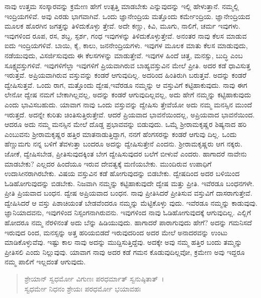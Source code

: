 ನಾವು ಉತ್ತಮ ಸಂಸ್ಕಾರವನ್ನು ಕ್ರಮೇಣ ಹೇಗೆ ಉತ್ಪತ್ತಿ ಮಾಡಬೇಕು ಎನ್ನುವುದನ್ನು ಇಲ್ಲಿ ಹೇಳುತ್ತಾನೆ. ನಮ್ಮಲ್ಲಿ ಇಂದ್ರಿಯಗಳಿವೆ. ಅವು ಎರಡು ಭಾಗವಾಗಿವೆ. ಒಂದು ಜ್ಞಾನೇಂದ್ರಿಯ ಮತ್ತೊಂದು ಕರ್ಮೇಂದ್ರಿಯ. ಜ್ಞಾನೇಂದ್ರಿಯದ ಮೂಲಕ ಹೊರಗಿನ ಜಗತ್ತನ್ನು ತಿಳಿದುಕೊಳ್ಳು ತ್ತೇವೆ. ಅದೇ ಕಣ್ಣು, ಕಿವಿ, ಮೂಗು, ನಾಲಿಗೆ, ಚರ್ಮ ಇವುಗಳು. ಇವುಗಳಿಂದ ರೂಪ, ರಸ, ಶಬ್ದ, ಸ್ಪರ್ಶ, ಗಂಧ ಇವುಗಳನ್ನು ತಿಳಿದುಕೊಳ್ಳುತ್ತೇವೆ. ಅನಂತರ ನಾವು ಕೆಲಸ ಮಾಡುವ ಐದು ಇಂದ್ರಿಯಗಳಿವೆ. ಬಾಯಿ, ಕೈ, ಕಾಲು, ಜನನೇಂದ್ರಿಯಗಳು. ಇವುಗಳ ಮೂಲಕ ಮಾತು ಕೆಲಸ ಮಾಡುವುದು, ನಡೆಯುವುದು, ವಿಸರ್ಜಿಸುವುದು ಈ ಕೆಲಸಗಳನ್ನು ಮಾಡುತ್ತೇವೆ. ಇವುಗಳ ಹಿಂದೆ ಚಿತ್ತ, ಮನಸ್ಸು, ಬುದ್ಧಿ ಎಂಬ ಸೂಕ್ಷ್ಮವಸ್ತುಗಳಿವೆ. ಇವುಗಳಿಗೆಲ್ಲಾ ಇವುಗಳಿಗೆ ಪ್ರಿಯವಾಗಿರುವ ಬಾಹ್ಯವಸ್ತುವಿನ ಮೇಲೆ ಪ್ರೀತಿ. ಅದರ ಕಡೆ ಧಾವಿಸುತ್ತ ಇರುತ್ತವೆ. ಅಪ್ರಿಯವಾಗಿರುವ ವಸ್ತುವನ್ನು ಕಂಡರೆ ಆಗುವುದಿಲ್ಲ. ಅದರಿಂದ ಹಿಂತಿರುಗಿ ಬರುತ್ತವೆ. ಅದನ್ನು ಕಂಡರೆ ದ್ವೇಷಿಸುತ್ತವೆ. ಒಂದು ರಾಗ, ಮತ್ತೊಂದು ದ್ವೇಷ,ಇವೆರಡೂ ನಮ್ಮನ್ನು ಆ ವಸ್ತುವಿಗೆ ಕಟ್ಟಿಹಾಕುವುದು. ನಾವು ಈಗ ಲೇನೋ ದ್ವೇಷ ನಮಗೆ ಬೇಕಾಗಿಲ್ಲವಲ್ಲ, ಅದನ್ನು ಕಂಡರೆ ಆಗುವುದಿಲ್ಲವಲ್ಲ, ಅದು ಹೇಗೆ ನಮ್ಮನ್ನು ಕಟ್ಟಿಹಾಕುವುದು ಎಂದು ಭಾವಿಸಬಹುದು. ಯಾವಾಗ ನಾವು ಒಂದು ವಸ್ತುವನ್ನು ದ್ವೇಷಿಸು ತ್ತೇವೆಯೋ ಅದು ನಮ್ಮ ಮನಸ್ಸಿನ ಮುಂದೆ ಇರುತ್ತದೆ. ಅದನ್ನೇ ಕುರಿತು ಚಿಂತಿಸುತ್ತಿರುತ್ತೇವೆ. ಆದರೆ ಪ್ರಿಯವಾದ ಭಾವನೆಯಿಂದಲ್ಲ, ಅಪ್ರಿಯವಾದ ಭಾವನೆಯಿಂದ. ಆದರೂ ಅದು ನಮ್ಮ ಮನಸ್ಸಿನ ಮೇಲೆ ದೊಡ್ಡ ಪ್ರಭಾವವನ್ನು ಬಿಡುವುದು. ಒಮ್ಮೆ ಶ‍್ರೀರಾಮಕೃಷ್ಣರ ಶಿಷ್ಯನಾದ ಹರಿ ಎಂಬುವನು ಶ‍್ರೀರಾಮಕೃಷ್ಣರ ಹತ್ತಿರ ಮಾತನಾಡುತ್ತಿದ್ದಾಗ, ನನಗೆ ಹೆಂಗಸರನ್ನು ಕಂಡರೆ ಆಗುವು ದಿಲ್ಲ. ಒಂದು ಹೆಣ್ಣುಮಗು ನನ್ನ ಬಳಿಗೆ ತೆವಳುತ್ತಾ ಬಂದರೂ ಅದನ್ನು ದ್ವೇಷಿಸುತ್ತೇನೆ ಎಂದನು. ಶ‍್ರೀರಾಮಕೃಷ್ಣರು ಆಗ ನಕ್ಕರು. ಜೋಕೆ, ದ್ವೇಷಿಸಬೇಡ, ಪ್ರೀತಿಸುವುದಕ್ಕಿಂತ ಬೇಗ ದ್ವೇಷಿಸುವುದರ ಬಲೆಗೆ ಬೀಳುವೆ ಎಂದರು. ಹಾಗಾದರೆ ನಾವೇನು ಮಾಡಬೇಕು? ಎಲ್ಲದರ ಹಿಂದೆಯೂ ಇರುವ ದೇವತ್ವಕ್ಕೆ ಮಣಿಯಬೇಕು. ಮುಂದಿರುವ ಉಪಾಧಿಗೆ ಉದಾಸೀನರಾಗಿರಬೇಕು. ವಿಷಯ ವಸ್ತುವಿನ ಕಡೆ ಹೋಗುವುದನ್ನು ಬಿಡಬೇಕು. ದ್ವೇಷದಿಂದ ಅದರ ಬಳಿಯಿಂದ ಓಡಿಹೋಗುವುದನ್ನು ಬಿಡಬೇಕು. ನಿಜವಾಗಿ ನಮ್ಮನ್ನು ಕಟ್ಟಿಹಾಕುವುದೇ ದ್ವೇಷ ಮತ್ತು ಪ್ರೀತಿ. ಇವೆರಡೂ ಬಂಧನಗಳೇ. ಪ್ರೀತಿ ಪ್ರಿಯವಾದ ಬಂಧನ. ದ್ವೇಷ ಅಪ್ರಿಯವಾದ ಬಂಧನ. ನಾವು ಪ್ರೀತಿಸಿದರೆ ಪ್ರೀತಿಸುವ ವಸ್ತುವಿಗೆ ದಾಸರಾಗುತ್ತೇವೆ. ದ್ವೇಷಿಸಿದರೆ ಆ ವಸ್ತು ಪಿಶಾಚಿಯಂತೆ ಬೇಡವೆಂದರೂ ನಮ್ಮನ್ನು ಮೆಟ್ಟಿಕೊಳ್ಳು ವುದು. ಇವೆರಡೂ ನಮ್ಮನ್ನು ಕಾಡುವುವು. ಜ್ಞಾನಿಯಾದವನು, ಇವುಗಳಿಂದ ನಿಸ್ಸಂಗನಾಗಿರುವನು. ಇವುಗಳಿಂದ ನಾವು ಓಡಿಹೋಗುವುದಕ್ಕೆ ಆಗುವುದಿಲ್ಲ. ಎಲ್ಲಿಗೆ ಹೋದರೂ ನಮ್ಮ ನೆರಳಿನಂತೆ ಅದು ಬೆನ್ನು ಹಿಡಿಯುವುದು. ಹಾಗಾದರೆ ಪಾರಾಗುವುದು ಹೇಗೆ? ಅದನ್ನು ಗಮನಿಸದೆ ಇರುವುದ ರಿಂದ, ಮನಸ್ಸನ್ನು ಅತ್ತ ಹರಿಯಬಿಡದೆ ಇರುವುದರಿಂದ ಅದರ ಮೇಲೆ ಅನಾದರವನ್ನು ಉಂಟು ಮಾಡಿಕೊಳ್ಳುವೆವು. ಇಷ್ಟು ಕಾಲ ನಾವು ಅದನ್ನು ಮುದ್ದಿಸುತ್ತಿದ್ದೆವು. ಅದಕ್ಕೇ ಅವು ನಮ್ಮ ಹತ್ತಿರ ಬಂದು ತಮ್ಮನ್ನು ಪ್ರೀತಿಸಲಿ ಎಂದು ನಿಲ್ಲುವುವು. ಯಾವಾಗ ನಾವು ಅದರ ಕಡೆ ಗಮನ ಕೊಡುವುದಿಲ್ಲವೋ, ಕ್ರಮೇಣ ಅವು ಇದ್ದರೂ ನಮ್ಮ ಪಾಲಿಗೆ ಇಲ್ಲದಂತೆ ಆಗುವುದು.

\begin{verse}
ಶ್ರೇಯಾನ್ ಸ್ವಧರ್ಮೋ ವಿಗುಣಃ ಪರಧರ್ಮಾತ್ ಸ್ವನುಷ್ಠಿತಾತ್~।\\ಸ್ವಧರ್ಮೇ ನಿಧನಂ ಶ್ರೇಯಃ ಪರಧರ್ಮೋ ಭಯಾವಹಃ 
\end{verse}

